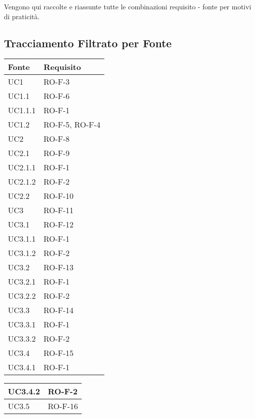 Vengono qui raccolte e riassunte tutte le combinazioni requisito - fonte per motivi di praticità.
\subsection{Tracciamento Filtrato per Fonte}
\begin{center}
\renewcommand{\arraystretch}{1.8} %
\begin{tabular}{ |m{8em}|m{13em}| }
    \hline
    \textbf{Fonte} & \textbf{Requisito} \\
    \hline
    UC1         &   RO-F-3 \\
    \hline
    UC1.1       &   RO-F-6 \\
    \hline
    UC1.1.1     &   RO-F-1 \\
    \hline
    UC1.2       &   RO-F-5, RO-F-4 \\
    \hline
    UC2         &   RO-F-8 \\
    \hline
    UC2.1       &   RO-F-9 \\
    \hline
    UC2.1.1     &   RO-F-1 \\
    \hline
    UC2.1.2     &   RO-F-2 \\
    \hline
    UC2.2       &   RO-F-10 \\
    \hline
    UC3         &   RO-F-11 \\
    \hline
    UC3.1       &   RO-F-12 \\
    \hline
    UC3.1.1     &   RO-F-1 \\
    \hline
    UC3.1.2     &   RO-F-2 \\
    \hline
    UC3.2       &   RO-F-13 \\
    \hline
    UC3.2.1     &   RO-F-1 \\
    \hline
    UC3.2.2     &   RO-F-2 \\
    \hline
    UC3.3       &   RO-F-14 \\
    \hline
    UC3.3.1     &   RO-F-1 \\
    \hline
    UC3.3.2     &   RO-F-2 \\
    \hline
    UC3.4       &   RO-F-15 \\
    \hline
    UC3.4.1     &   RO-F-1 \\
    \hline
    \end{tabular}
    \newpage
    \begin{tabular}{ |m{8em}|m{13em}| }
    \hline
    UC3.4.2     &   RO-F-2 \\
    \hline
    UC3.5       &   RO-F-16 \\

\end{tabular}
\end{center}
